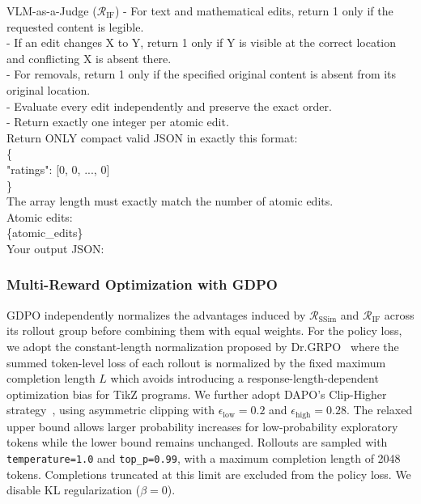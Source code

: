 \begin{PromptBox}{VLM-as-a-Judge ($\mathcal{R}_{\mathrm{IF}}$)}
- For text and mathematical edits, return 1 only if the requested content is legible. \\
- If an edit changes X to Y, return 1 only if Y is visible at the correct location and conflicting X is absent there. \\
- For removals, return 1 only if the specified original content is absent from its original location. \\
- Evaluate every edit independently and preserve the exact order. \\
- Return exactly one integer per atomic edit. \\
Return ONLY compact valid JSON in exactly this format:\\
{\ttfamily
\{ \\
\hspace*{1.5em}"ratings": [0, 0, ..., 0] \\
\} \\
}
The array length must exactly match the number of atomic edits. \\
Atomic edits:\\
\{atomic\_edits\} \\
Your output JSON:
\label{fig:prompt_instruction_following}
\end{PromptBox}

\subsubsection{Multi-Reward Optimization with GDPO}
\label{subsubsec:Multi-Reward Optimization with GDPO}
GDPO independently normalizes the advantages induced by $\mathcal{R}_{\mathrm{SSim}}$ and $\mathcal{R}_{\mathrm{IF}}$ across its rollout group before combining them with equal weights. For the policy loss, we adopt the constant-length normalization proposed by Dr.GRPO~\citep{liu2025understanding} where the summed token-level loss of each rollout is normalized by the fixed maximum completion length $L$ which avoids introducing a response-length-dependent optimization bias for TikZ programs. We further adopt DAPO's Clip-Higher strategy~\citep{yu2025dapo}, using asymmetric clipping with $\epsilon_{\mathrm{low}}=0.2$ and $\epsilon_{\mathrm{high}}=0.28$. The relaxed upper bound allows larger probability increases for low-probability exploratory tokens while the lower bound remains unchanged. Rollouts are sampled with \texttt{temperature=1.0} and \texttt{top\_p=0.99}, with a maximum completion length of 2048 tokens. Completions truncated at this limit are excluded from the policy loss. We disable KL regularization ($\beta=0$).

